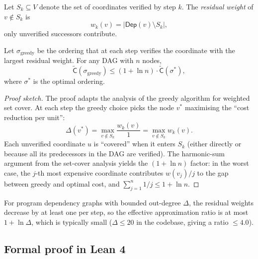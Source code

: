 \documentclass[11pt]{article}
\newcommand{\VerCost}{\mathsf{C}}           %
\newcommand{\DepSet}{\mathsf{Dep}}          %
\newcommand{\wtotal}{\widetilde{\VerCost}}  %
\newcommand{\sortord}{\sigma^{*}}           %
\newcommand{\anyord}{\sigma}                %
\newcommand{\wt}{w}                         %
\begin{document}
\begin{definition}\label{def:dyn-weight}
Let $S_k \subseteq V$ denote the set of coordinates verified by step
$k$.  The \emph{residual weight} of $v \notin S_k$ is
\[
  \wt_k(v) = |\DepSet(v) \setminus S_k|,
\]
\ie{} only unverified successors contribute.
\end{definition}

\begin{theorem}\label{thm:approx}
Let $\anyord_{\mathrm{greedy}}$ be the ordering that at each step
verifies the coordinate with the largest residual weight.  For any DAG
with $n$ nodes,
\[
  \wtotal(\anyord_{\mathrm{greedy}})
  \leq (1 + \ln n) \cdot \wtotal(\sortord),
\]
where $\sortord$ is the optimal ordering.
\end{theorem}
\begin{proof}[Proof sketch]
The proof adapts the analysis of the greedy algorithm for weighted
set cover.  At each step the greedy choice picks the node $v^*$
maximising the ``cost reduction per unit'':
\[
  \Delta(v^*) = \max_{v \notin S_k}
  \frac{\wt_k(v)}{1}
  = \max_{v \notin S_k} \wt_k(v).
\]
Each unverified coordinate $u$ is ``covered'' when it enters $S_k$
(either directly or because all its predecessors in the DAG are
verified).  The harmonic-sum argument from the set-cover analysis
yields the $(1 + \ln n)$ factor: in the worst case, the
$j$-th most expensive coordinate contributes $\wt(v_j) / j$ to the
gap between greedy and optimal cost, and
$\sum_{j=1}^{n} 1/j \leq 1 + \ln n$.
\end{proof}

\begin{corollary}\label{cor:practical-gap}
For program dependency graphs with bounded out-degree $\Delta$, the
residual weights decrease by at least one per step, so the effective
approximation ratio is at most $1 + \ln \Delta$, which is typically
small ($\Delta \leq 20$ in the \JuGeo{} codebase, giving a ratio
$\leq 4.0$).
\end{corollary}

\subsection{Formal proof in Lean 4}
\end{document}
